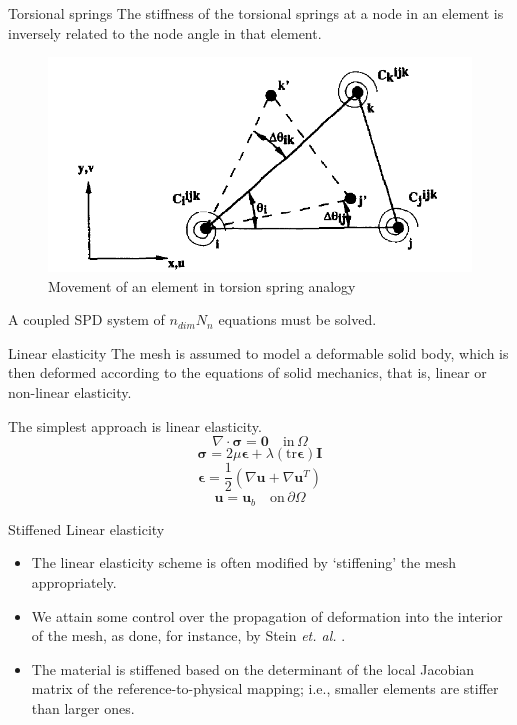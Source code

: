 \documentclass[t,12pt]{beamer}
\let\bld\boldsymbol
\begin{document}
\begin{frame}{Torsional springs}
The stiffness of the torsional springs at a node in an element is inversely related to the node angle in that element.
 \begin{figure}
 	\centering
 	\includegraphics[scale=0.25]{torsionspring}
 	\caption{Movement of an element in torsion spring analogy}
 	\label{fig:torsion}
 \end{figure}
 A coupled SPD system of $n_{dim} N_n$ equations must be solved.
\end{frame}

\begin{frame}{Linear elasticity}
  The mesh is assumed to model a deformable solid body, which is then deformed according to the equations of solid mechanics, that is, linear or non-linear elasticity.
  
  The simplest approach is linear elasticity.
  \begin{equation}
  \nabla \cdot \bld{\sigma}  = \mathbf{0} \quad \text{in} \, \Omega
  \end{equation}
  \begin{equation}
  \bld{\sigma} = 2\mu\bld{\epsilon} + \lambda (\mathrm{tr}\boldsymbol{\epsilon}) \bld{I}
  \label{linelast:constt}
  \end{equation}
  \begin{equation}
  \bld{\epsilon} = \frac12 (\nabla\bld{u}+\nabla\bld{u}^T)
  \label{linelast:strain}
  \end{equation}
  \begin{equation}
  \bld{u} = \bld{u}_b \quad \text{on} \, \partial\Omega
  \end{equation}
\end{frame}

\begin{frame}{Stiffened Linear elasticity}
	\begin{itemize}
	\item The linear elasticity scheme is often modified by `stiffening' the mesh appropriately. 
	\item We attain some control over the propagation of deformation into the interior of the mesh, as done, for instance, by Stein \emph{et. al.} .
	\item The material is stiffened based on the determinant of the local Jacobian matrix of the reference-to-physical mapping; i.e., smaller elements are stiffer than larger ones.
	\end{itemize}
\end{frame}
\end{document}
